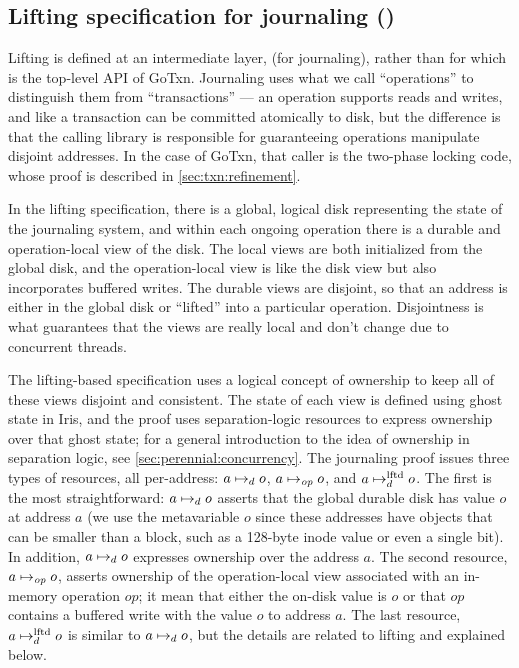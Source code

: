 \subsection{Lifting specification for journaling ()}
\label{sec:txn:lifting}

Lifting is defined at an intermediate layer,  (for journaling), rather
than for  which is the top-level API of GoTxn. Journaling uses what we
call ``operations'' to distinguish them from ``transactions'' --- an operation
supports reads and writes, and like a transaction can be committed atomically to
disk, but the difference is that the calling library is responsible for guaranteeing
operations manipulate disjoint addresses. In the case of GoTxn, that caller is
the two-phase locking code, whose proof is described in \cref{sec:txn:refinement}.

In the lifting specification, there is a global, logical disk representing the
state of the journaling system, and within each ongoing operation there is a
durable and operation-local view of the disk. The local views are both
initialized from the global disk, and the operation-local view is like the disk
view but also incorporates buffered writes. The durable views are disjoint, so
that an address is either in the global disk or ``lifted'' into a particular
operation. Disjointness is what guarantees that the views are really local and
don't change due to concurrent threads.

The lifting-based specification uses a logical concept of ownership to keep all
of these views disjoint and consistent. The state of each view is defined using ghost state
in Iris, and the proof uses separation-logic resources to express ownership over that
ghost state; for a general introduction to the idea of
ownership in separation logic, see \cref{sec:perennial:concurrency}. The
journaling proof issues three types of resources, all per-address:
$a \mapsto_d o$, $a \mapsto_{\mathit{op}} o$, and $a \mapsto_d^{\mathrm{lftd}} o$. The first is the most
straightforward: $a \mapsto_d o$ asserts that the global durable disk has
value $o$ at address $a$ (we use the metavariable $o$ since these addresses have
objects that can be smaller than a block, such as a 128-byte inode value or even
a single bit). In addition, $a \mapsto_d o$ expresses ownership over the
address $a$. The second resource, $a \mapsto_{\mathit{op}} o$, asserts ownership of the
operation-local view associated with an in-memory operation $\mathit{op}$; it
mean that either the on-disk value is $o$ or that $\mathit{op}$ contains a
buffered write with the value $o$ to address $a$. The last resource,
$a \mapsto_d^{\mathrm{lftd}} o$ is similar to $a \mapsto_d o$, but the details are related
to lifting and explained below.


